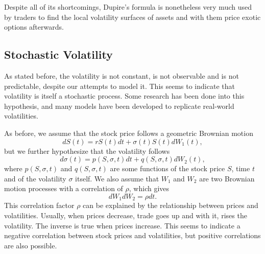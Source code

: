 Despite all of its shortcomings, Dupire's formula is nonetheless very much used by traders to find the local volatility surfaces of assets and with them price exotic options afterwards.

\subsection{Stochastic Volatility}
\label{subsection:stochastic volatility}
As stated before, the volatility is not constant, is not observable and is not predictable, despite our attempts to model it. This seems to indicate that volatility is itself a stochastic process. Some research has been done into this hypothesis, and many models have been developed to replicate real-world volatilities.

As before, we assume that the stock price follows a geometric Brownian motion
\begin{equation}\label{stochvol}
dS(t)=rS(t)dt+\sigma(t)S(t)dW_1(t),
\end{equation}
\noindent but we further hypothesize that the volatility follows
\begin{equation}
d\sigma(t)=p(S,\sigma,t)dt+q(S,\sigma,t)dW_2(t),
\end{equation}
\noindent where $p(S,\sigma,t)$ and $q(S,\sigma,t)$ are some functions of the stock price $S$, time $t$ and of the volatility $\sigma$ itself. We also assume that $W_1$ and $W_2$ are two Brownian motion processes with a correlation of $\rho$, which gives
\begin{equation}
dW_1dW_2=\rho dt.
\end{equation}
\noindent This correlation factor $\rho$ can be explained by the relationship between prices and volatilities. Usually, when prices decrease, trade goes up and with it, rises the volatility. The inverse is true when prices increase. This seems to indicate a negative correlation between stock prices and volatilities, but positive correlations are also possible.

\iffalse
\hl{This correlation can be explained by the relationship between prices and volatilities.} As an example, we can consider a stock that costs \textdollar100 and changes by \textdollar0.10 daily. We can estimate, even without calculations, that it is very stable and thus has a low volatility.
On the other hand if another stock costs \textdollar1 and changes by \textdollar0.10 in a day, we can see that it is extremely volatile even though it changed by the same amount as the first. With this example, we can see that the volatility has some correlation with the stock price.
\fi

